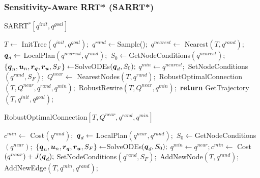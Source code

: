 \subsubsection{Sensitivity-Aware RRT* (SARRT*)}

\begin{algorithm}[htp]
    \caption{SARRT$^* [q^{init}, q^{goal}]$}\label{alg:SARRT*}
    \begin{algorithmic}[1]
        \State $T \gets$ InitTree$({q^{init}, q^{goal}});$
            \State $q^{rand} \gets $Sample()$;$
            \State $q^{nearest} \gets$ Nearest$(T,{q^{rand}});$
            \State $\boldsymbol{q}_d \gets$ LocalPlan$({q^{nearest}},{q^{rand}});$
            \State $S_0 \gets $GetNodeConditions$({q^{nearest}});$
            \State $\left \{\boldsymbol{q}_n, \boldsymbol{u}_n, \boldsymbol{r_q}, \boldsymbol{r_u}, S_F \right \}  \gets $SolveODEs$(\boldsymbol{q}_d, S_0);$
                \State $q^{min} \gets q^{nearest};$
                \State SetNodeConditions$({q^{rand}}, S_{F});$
                \State $Q^{near} \gets$ NearestNodes$(T,{q^{rand}});$
                \State RobustOptimalConnection$(T, Q^{near}, q^{rand}, q^{min});$
                \State RobustRewire$(T, Q^{near}, q^{min});$
            \EndIf
        \EndWhile
        \State \textbf{return} GetTrajectory$(T, q^{init}, q^{goal})$;
    \end{algorithmic}
\end{algorithm}

\begin{algorithm}[htp]
    \caption{RobustOptimalConnection$[T, Q^{near}, q^{rand}, q^{min}]$}\label{alg:RobustOptimalConnect}
    \begin{algorithmic}[1]
        \State $c^{min} \gets$ Cost$(q^{rand});$
            \State $\boldsymbol{q}_d \gets$ LocalPlan$(q^{near},q^{rand});$
            \State $S_0 \gets $GetNodeConditions$({q^{near}});$
            \State $\left \{\boldsymbol{q}_n, \boldsymbol{u}_n, \boldsymbol{r_q}, \boldsymbol{r_u}, S_F \right \}  \gets $SolveODEs$(\boldsymbol{q}_d, S_0);$
                    \State $q^{min} \gets q^{near}; c^{min} \gets$ Cost$(q^{near}) + J(\boldsymbol{q}_d);$
                    \State SetNodeConditions$({q^{rand}}, S_{F});$
                \EndIf
            \EndIf
        \EndFor
        \State AddNewNode$(T, {q^{rand}});$
        \State AddNewEdge$(T, {q^{min}}, {q^{rand}});$
    \end{algorithmic}
\end{algorithm}

